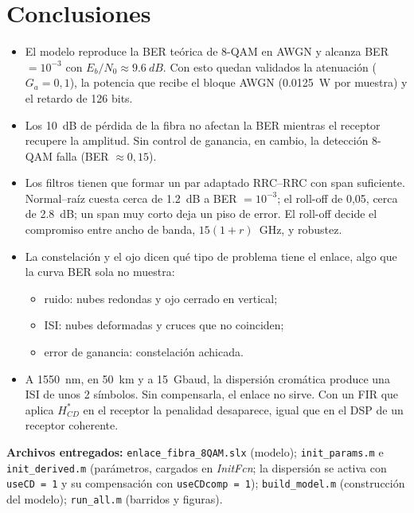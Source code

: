 \documentclass[10pt,a4paper]{article}
\begin{document}
\section{Conclusiones}
\begin{itemize}\setlength\itemsep{1pt}
\item El modelo reproduce la BER teórica de 8-QAM en AWGN y alcanza BER $=10^{-3}$ con $E_b/N_0\approx\SI{9.6}{dB}$. Con esto quedan validados la atenuación ($G_a=0{,}1$), la potencia que recibe el bloque AWGN (\SI{0.0125}{W} por muestra) y el retardo de 126 bits.
\item Los \SI{10}{dB} de pérdida de la fibra no afectan la BER mientras el receptor recupere la amplitud. Sin control de ganancia, en cambio, la detección 8-QAM falla (BER $\approx0{,}15$).
\item Los filtros tienen que formar un par adaptado RRC--RRC con span suficiente. Normal--raíz cuesta cerca de \SI{1.2}{dB} a BER $=10^{-3}$; el roll-off de 0,05, cerca de \SI{2.8}{dB}; un span muy corto deja un piso de error. El roll-off decide el compromiso entre ancho de banda, $15(1+r)$~GHz, y robustez.
\item La constelación y el ojo dicen qué tipo de problema tiene el enlace, algo que la curva BER sola no muestra:
\begin{itemize}\setlength\itemsep{0pt}
\item ruido: nubes redondas y ojo cerrado en vertical;
\item ISI: nubes deformadas y cruces que no coinciden;
\item error de ganancia: constelación achicada.
\end{itemize}
\item A \SI{1550}{nm}, en \SI{50}{km} y a \SI{15}{Gbaud}, la dispersión cromática produce una ISI de unos 2 símbolos. Sin compensarla, el enlace no sirve. Con un FIR que aplica $H^*_{CD}$ en el receptor la penalidad desaparece, igual que en el DSP de un receptor coherente.
\end{itemize}

\noindent\textbf{Archivos entregados:} \texttt{enlace\_fibra\_8QAM.slx} (modelo); \texttt{init\_params.m} e \texttt{init\_derived.m} (parámetros, cargados en \textit{InitFcn}; la dispersión se activa con \texttt{useCD = 1} y su compensación con \texttt{useCDcomp = 1}); \texttt{build\_model.m} (construcción del modelo); \texttt{run\_all.m} (barridos y figuras).
\end{document}
